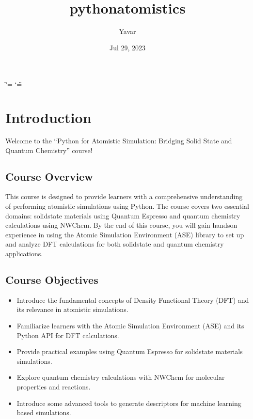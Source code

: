 \documentclass[letterpaper,10pt,english]{sphinxmanual}
\title{pythonatomistics}
\date{Jul 29, 2023}
\author{Yavar}
\begin{document}
\ifdefined\shorthandoff
  \ifnum\catcode`\=\string=\active\shorthandoff{=}\fi
  \ifnum\catcode`\"=\active{}\fi
\fi

\pagestyle{empty}
\sphinxmaketitle
\pagestyle{plain}
\sphinxtableofcontents
\pagestyle{normal}
\label{\detokenize{index::doc}}



\chapter{Introduction}
\label{\detokenize{index:introduction}}
\sphinxAtStartPar
Welcome to the “Python for Atomistic Simulation: Bridging Solid State and Quantum Chemistry” course!


\section{Course Overview}
\label{\detokenize{index:course-overview}}
\sphinxAtStartPar
This course is designed to provide learners with a comprehensive understanding of performing atomistic simulations using Python. The course covers two essential domains: solid\sphinxhyphen{}state materials using Quantum Espresso and quantum chemistry calculations using NWChem. By the end of this course, you will gain hands\sphinxhyphen{}on experience in using the Atomic Simulation Environment (ASE) library to set up and analyze DFT calculations for both solid\sphinxhyphen{}state and quantum chemistry applications.


\section{Course Objectives}
\label{\detokenize{index:course-objectives}}\begin{itemize}
\item {} 
\sphinxAtStartPar
Introduce the fundamental concepts of Density Functional Theory (DFT) and its relevance in atomistic simulations.

\item {} 
\sphinxAtStartPar
Familiarize learners with the Atomic Simulation Environment (ASE) and its Python API for DFT calculations.

\item {} 
\sphinxAtStartPar
Provide practical examples using Quantum Espresso for solid\sphinxhyphen{}state materials simulations.

\item {} 
\sphinxAtStartPar
Explore quantum chemistry calculations with NWChem for molecular properties and reactions.

\item {} 
\sphinxAtStartPar
Introduce some advanced tools to generate descriptors for machine learning based simulations.

\end{itemize}
\end{document}

